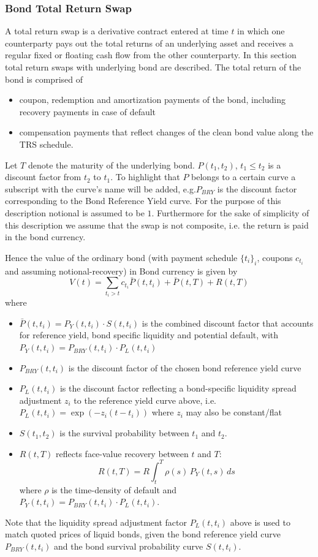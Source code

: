 \subsubsection{Bond Total Return Swap}


A total return swap is a derivative contract entered at time $t$ in
which one counterparty pays out the total returns of an underlying
asset and receives a regular fixed or floating cash flow from the
other counterparty. In this section total return swaps with underlying
bond are described. The total return of the bond is comprised of
%
\begin{itemize}
\item coupon, redemption and amortization payments of the bond,
  including  recovery payments in case of default
\item compensation payments that reflect changes of the clean bond
  value along the TRS schedule.
\end{itemize}
Let $T$ denote the maturity of the underlying bond. $P(t_1,t_2)$,
$t_1\leq t_2$ is a discount factor from $t_2$ to $t_1$. To highlight
that $P$ belongs to a certain curve a subscript with the curve's name
will be added, e.g.$P_{BRY}$ is the discount factor corresponding to
the Bond Reference Yield curve. For the purpose of this description
notional is assumed to be $1$. Furthermore for the sake of simplicity
of this description we assume that the swap is not composite, i.e. the
return is paid in the bond currency.

Hence the value of the ordinary bond (with payment schedule
$\{t_i\}_i$, coupons $c_{t_i}$ and assuming notional-recovery) in Bond
currency is given by
\begin{equation}
V(t)=\sum_{t_i>t}c_{t_i}{\bar P}(t,t_i)+{\bar P}(t,T)+R(t,T)
\label{bondprice}
\end{equation}
where
\begin{itemize}
\item $\bar{P}(t,t_i)=P_Y(t,t_i)\cdot S(t,t_i)$ is
  the combined discount factor that accounts for reference yield,
  bond specific liquidity and  potential default, with
  $P_Y(t,t_i)=P_{BRY}(t,t_i)\cdot P_L(t,t_i)$
\item $P_{BRY}(t,t_i)$ is the discount factor of the chosen bond reference
  yield curve
\item $P_L(t,t_i)$ is the discount factor reflecting a
  bond-specific liquidity spread adjustment $z_i$ to the reference
  yield curve  above, i.e.~$P_L(t,t_i)=\exp(-z_i(t-t_i))$ where $z_i$
  may also be constant/flat
\item $S(t_1,t_2)$ is the survival
  probability between $t_1$ and $t_2$.
\item $R(t,T)$ reflects face-value recovery between $t$ and
  $T$:
  $$R(t,T)=R\int_{t}^T\rho(s)\,P_{Y}(t,s) \,ds$$
  where $\rho$ is the time-density of default and
  $P_Y(t,t_i)=P_{BRY}(t,t_i)\cdot P_L(t,t_i)$.
\end{itemize}
Note that the liquidity spread adjustment factor $P_L(t,t_i)$  above
is used to match quoted prices of liquid bonds, given the bond
reference yield curve $P_{BRY}(t,t_i)$ and the bond survival
probability curve $S(t,t_i)$.

